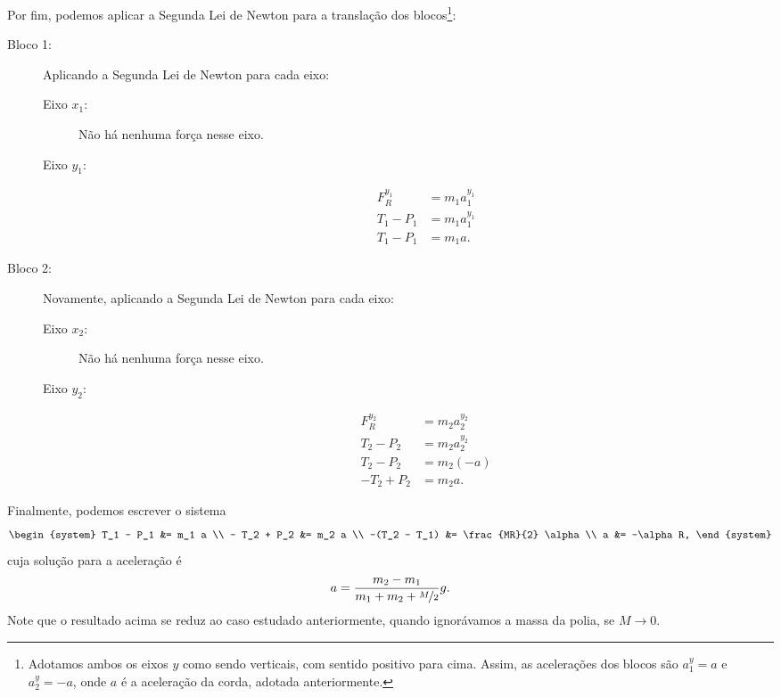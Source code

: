 Por fim, podemos aplicar a Segunda Lei de Newton para a translação dos blocos\footnote{Adotamos ambos os eixos $y$ como sendo verticais, com sentido positivo para cima. Assim, as acelerações dos blocos são $a_1^y = a$ e $a_2^y = -a$, onde $a$ é a aceleração da corda, adotada anteriormente.}:
\begin{description}
    \item[Bloco 1:] Aplicando a Segunda Lei de Newton para cada eixo:
        \begin{description}
            \item[Eixo $x_1$:] Não há nenhuma força nesse eixo.
            \item[Eixo $y_1$:]
                \begin{align}
                    F_R^{y_1} &= m_1 a_1^{y_1} \\
                    T_1 - P_1 &= m_1 a_1^{y_1} \\
                    T_1 - P_1 &= m_1 a.
                \end{align}
        \end{description}
    \item[Bloco 2:] Novamente, aplicando a Segunda Lei de Newton para cada eixo:
        \begin{description}
            \item[Eixo $x_2$:] Não há nenhuma força nesse eixo.
            \item[Eixo $y_2$:]
                \begin{align}
                    F_R^{y_2} &= m_2 a_2^{y_2} \\
                    T_2 - P_2 &= m_2 a_2^{y_2} \\
                    T_2 - P_2 &= m_2 (-a) \\
                    - T_2 + P_2 &= m_2 a.
                \end{align}
        \end{description}
\end{description}

Finalmente, podemos escrever o sistema
\begin{equation}
\begin{system}
    T_1 - P_1 &= m_1 a \\
    - T_2 + P_2 &= m_2 a \\
    -(T_2 - T_1) &= \frac{MR}{2} \alpha \\
    a &= -\alpha R,
\end{system}
\end{equation}
%
cuja solução para a aceleração é
\begin{equation}
    a = \frac{m_2 - m_1}{m_1+m_2+\nicefrac{M}{2}} g.
\end{equation}
%
Note que o resultado acima se reduz ao caso estudado anteriormente, quando ignorávamos a massa da polia, se $M \to 0$.

